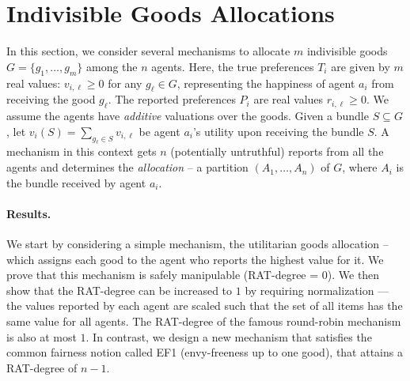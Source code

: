 
\section{Indivisible Goods Allocations}\label{sec:indivisible-good-aloc}
In this section, we consider several mechanisms to allocate $m$ indivisible goods $G = \{g_1, \ldots, g_m\}$ among the $n$ agents.
Here, the true preferences $T_i$ are given by $m$ real values: $v_{i,\ell}  \geq 0$ for any $g_{\ell} \in G$, representing the happiness of agent $a_i$ from receiving the good $g_{\ell}$. 
The reported preferences $P_i$ are real values $r_{i,\ell} \geq 0 $.
We assume the agents have \emph{additive} valuations over the goods.
Given a bundle $S\subseteq G$, let $v_i(S)=\sum_{g_\ell\in S}v_{i,\ell}$ be agent $a_i$'s utility upon receiving the bundle $S$.
%
A mechanism in this context gets $n$ (potentially untruthful) reports from all the agents and determines the \emph{allocation} -- a partition $(A_1,\ldots,A_n)$ of $G$, where $A_i$ is the bundle received by agent $a_i$.



\paragraph{Results.} We start by considering a simple mechanism, the utilitarian goods allocation -- which assigns each good to the agent who reports the highest value for it.
We prove that this mechanism is safely manipulable (RAT-degree = $0$). 
We then show that the RAT-degree can be increased to $1$ by requiring normalization --- the values reported by each agent are scaled such that the set of all items has the same value for all agents.
The RAT-degree of the famous round-robin mechanism is also at most $1$.
In contrast, we design a new mechanism that satisfies the common fairness notion called EF1 (envy-freeness up to one good), that attains a RAT-degree of $n-1$.



